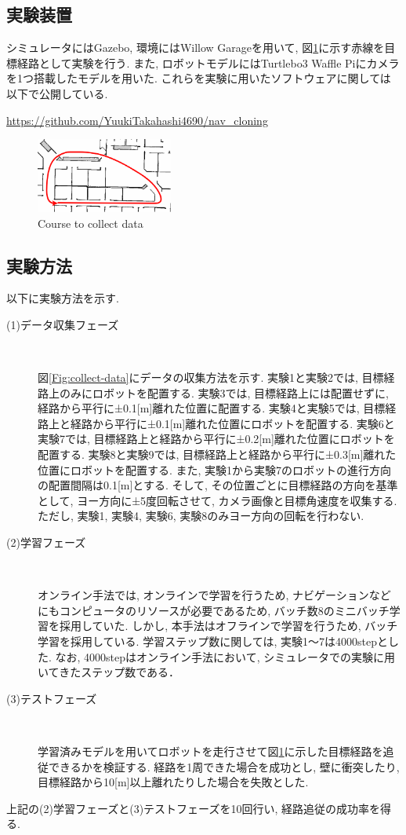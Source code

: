 \documentclass{ujarticle}
\begin{document}
\subsection{実験装置}シミュレータにはGazebo\cite{gazebo}, 環境にはWillow Garage\cite{willow}を用いて, 図\ref{Fig:willow}に示す赤線を目標経路として実験を行う. また, ロボットモデルにはTurtlebo3 Waffle Pi\cite{turtlebot3}にカメラを1つ搭載したモデルを用いた. これらを実験に用いたソフトウェアに関しては以下で公開している. \par \url{https://github.com/YuukiTakahashi4690/nav_cloning}

\begin{figure}[h]
		\centering
		\includegraphics[width=0.4\textwidth]{img/willow-path.png}
		\caption{Course to collect data}
		\label{Fig:willow}
\end{figure}

\subsection{実験方法}
以下に実験方法を示す. 
\begin{description}
		\item[(1)データ収集フェーズ]　
		
		図\ref{Fig:collect-data}にデータの収集方法を示す. 実験1と実験2では, 目標経路上のみにロボットを配置する. 実験3では, 目標経路上には配置せずに, 経路から平行に±0.1[m]離れた位置に配置する. 実験4と実験5では, 目標経路上と経路から平行に±0.1[m]離れた位置にロボットを配置する. 実験6と実験7では, 目標経路上と経路から平行に±0.2[m]離れた位置にロボットを配置する. 実験8と実験9では, 目標経路上と経路から平行に±0.3[m]離れた位置にロボットを配置する. また, 実験1から実験7のロボットの進行方向の配置間隔は0.1[m]とする. そして, その位置ごとに目標経路の方向を基準として, ヨー方向に±5度回転させて, カメラ画像と目標角速度を収集する. ただし, 実験1, 実験4, 実験6, 実験8のみヨー方向の回転を行わない. 
		\item[(2)学習フェーズ]　
		
		オンライン手法では, オンラインで学習を行うため, ナビゲーションなどにもコンピュータのリソースが必要であるため, バッチ数8のミニバッチ学習を採用していた. しかし, 本手法はオフラインで学習を行うため, バッチ学習を採用している. 学習ステップ数に関しては, 実験1～7は4000stepとした. なお, 4000stepはオンライン手法において, シミュレータでの実験に用いてきたステップ数である． 
		\item[(3)テストフェーズ]　
		
		学習済みモデルを用いてロボットを走行させて図\ref{Fig:willow}に示した目標経路を追従できるかを検証する. 経路を1周できた場合を成功とし, 壁に衝突したり, 目標経路から10[m]以上離れたりした場合を失敗とした.
\end{description}
上記の(2)学習フェーズと(3)テストフェーズを10回行い, 経路追従の成功率を得る. 
\end{document}

